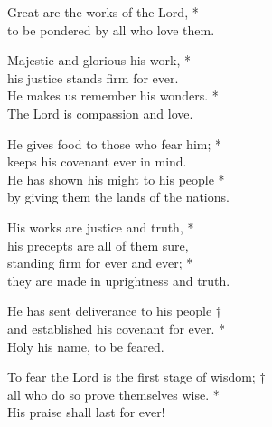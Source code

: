     Great are the works of the Lord, *\\
    to be pondered by all who love them.

    Majestic and glorious his work, *\\
    his justice stands firm for ever.\\
    He makes us remember his wonders. *\\
    The Lord is compassion and love.

    He gives food to those who fear him; *\\
    keeps his covenant ever in mind.\\
    He has shown his might to his people *\\
    by giving them the lands of the nations.

    His works are justice and truth, *\\
    his precepts are all of them sure,\\
    standing firm for ever and ever; *\\
    they are made in uprightness and truth.

    He has sent deliverance to his people †\\
    and established his covenant for ever. *\\
    Holy his name, to be feared.

    To fear the Lord is the first stage of wisdom; †\\
    all who do so prove themselves wise. *\\
    His praise shall last for ever!
